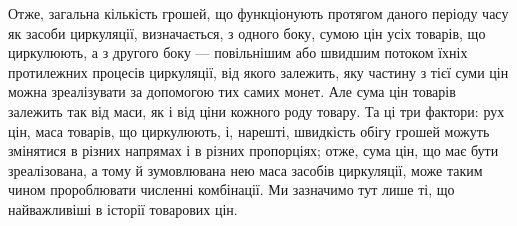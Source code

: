 Отже, загальна кількість грошей, що функціонують протягом
даного періоду часу як засоби циркуляції, визначається, з одного
боку, сумою цін усіх товарів, що циркулюють, а з другого боку —
повільнішим або швидшим потоком їхніх протилежних процесів
циркуляції, від якого залежить, яку частину з тієї суми цін можна
зреалізувати за допомогою тих самих монет. Але сума цін товарів
залежить так від маси, як і від ціни кожного роду товару. Та ці
три фактори: рух цін, маса товарів, що циркулюють, і, нарешті,
швидкість обігу грошей можуть змінятися в різних напрямах
і в різних пропорціях; отже, сума цін, що має бути зреалізована,
а тому й зумовлювана нею маса засобів циркуляції, може таким
чином пророблювати численні комбінації. Ми зазначимо тут лише
ті, що найважливіші в історії товарових цін.

